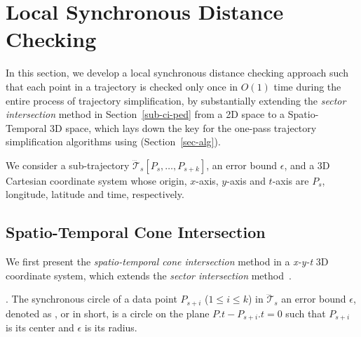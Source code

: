 \section{Local Synchronous Distance Checking}
\label{sec-localcheck}


In this section, we develop a local synchronous distance checking approach such that each point in a trajectory is checked only once in $O(1)$ time during the entire process of trajectory simplification, by substantially extending the \textit{sector intersection} method in Section~\ref{sub-ci-ped} from a 2D space to a Spatio-Temporal 3D space, which lays down the key for the one-pass trajectory simplification algorithms using \sed (Section~\ref{sec-alg}).

We consider a sub-trajectory $\dddot{\mathcal{T}}_s[P_s, \ldots, P_{s+k}]$, an error bound $\epsilon$, and a 3D Cartesian coordinate system whose origin, $x$-axis, $y$-axis and $t$-axis  are $P_s$, longitude, latitude and time, respectively.

\subsection{Spatio-Temporal Cone Intersection}

We first present the \textit{spatio-temporal cone intersection} method in a \emph{x-y-t} 3D coordinate system, which extends the \textit{sector intersection} method~\cite{Williams:Longest, Sklansky:Cone, Zhao:Sleeve}. %





. The synchronous circle of a data point $P_{s+i}$ ($1\le i\le k$) in $\dddot{\mathcal{T}}_s$ \wrt an error bound $\epsilon$, denoted as , or  in short, is a circle on the plane $P.t-P_{s+i}.t = 0$ such that $P_{s+i}$ is its center and $\epsilon$ is its radius.

